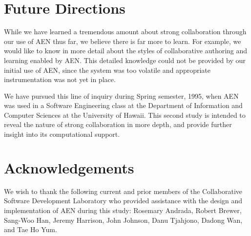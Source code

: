 
\section{Future Directions}

While we have learned a tremendous amount about strong collaboration
through our use of AEN thus far, we believe there is far more to learn.
For example, we would like to know in more detail about the styles
of collaborative authoring and learning enabled by AEN.  This detailed 
knowledge could not be provided by our initial use of AEN, since the
system was too volatile and appropriate instrumentation was not yet in
place. 

We have pursued this line of inquiry during Spring semester, 1995, when
AEN was used in a Software Engineering class at the Department of
Information and Computer Sciences at the University of Hawaii.  This second
study is intended to reveal the nature of strong collaboration in more
depth, and provide further insight into its computational support.

\section{Acknowledgements}

We wish to thank the following current and prior members of the
Collaborative Software Development Laboratory who provided assistance with
the design and implementation of AEN during this study: Rosemary Andrada,
Robert Brewer, Sang-Woo Han, Jeremy Harrison, John Johnson, Danu Tjahjono,
Dadong Wan, and Tae Ho Yum. 
